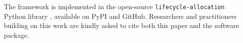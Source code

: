 \documentclass[11pt]{article}
\begin{document}
The framework is implemented in the open-source \texttt{lifecycle-allocation}
Python library \citep{lifecycle_allocation}, available on PyPI and GitHub.
Researchers and practitioners building on this work are kindly asked to cite
both this paper and the software package.

\bigskip



\end{document}

